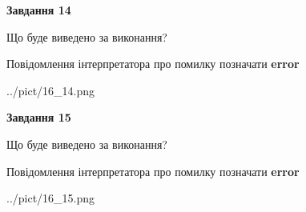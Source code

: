 \documentclass[11pt, ukrainian]{article}
\begin{document}
{\begin {large}
{\begin {center}\textbf{Завдання 14}\end {center}}\par
Що буде виведено за виконання? \par
Повідомлення інтерпретатора про помилку позначати \textbf{error}

\begin{center}
	{../pict/16_14.png}
\end{center}
\newpage

{\begin {center}\textbf{Завдання 15}\end {center}}\par
Що буде виведено за виконання? \par
Повідомлення інтерпретатора про помилку позначати \textbf{error}

\begin{center}
	{../pict/16_15.png}
\end{center}
\newpage

\end {large}}
\end{document}
